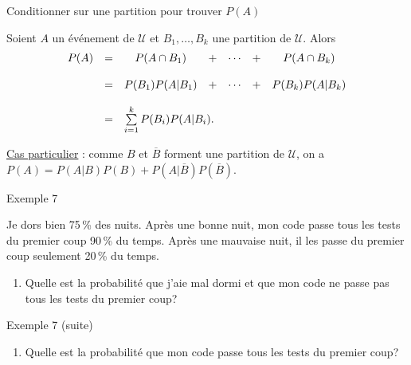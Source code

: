 \documentclass{BeamerTemplate}
\newcommand{\cibleReponse}{}
\newcommand{\lienreponse}[1]{\gdef\cibleReponse{#1}}
\begin{document}
\begin{frame}[t]{Conditionner sur une partition pour trouver $P(A)$}
 \begin{thm}{}
  Soient $A$ un événement de $\mathcal{U}$ et $B_1,\ldots,B_k$ une partition
  de $\mathcal{U}$. Alors
  $$\begin{array}{llccccc}
P(A)&=& P(A\cap B_1) &+&\cdots&+&P(A\cap B_k)\\
&&&&&&\\
    &=&P(B_1)P(A|B_1)&+&\cdots&+&P(B_k)P(A|B_k)\\
&&&&&&\\
    &=&\multicolumn{5}{l}{\sum\limits_{i=1}^k P(B_i)P(A|B_i).}\\
\end{array}
$$
 \end{thm}


 \bigskip
 \underline{Cas particulier} : comme $B$ et $\overline{B}$ forment une partition
 de $\mathcal{U}$, on a $P(A)=P(A|B)P(B)+P(A|\overline{B})P(\overline{B})$.
\end{frame}
\begin{frame}[t,label=ex7]{Exemple 7}

{\small Je dors bien 75\,\% des nuits. Après une bonne nuit, mon code passe tous les
 tests du premier coup 90\,\% du temps. Après une mauvaise nuit, il les passe du
 premier coup seulement 20\,\% du temps.

\begin{enumerate}\itemsep 2cm
\item[a)] Quelle est la probabilité que j'aie mal dormi et que mon code ne passe pas
 tous les tests du premier coup?
\end{enumerate}

}
\lienreponse{rep-ex2}
\end{frame}
\begin{frame}[t]{Exemple 7 (suite)}

{\small
\begin{enumerate}\itemsep 2cm
\item[b)] Quelle est la probabilité que mon code passe tous les tests du premier coup?
\end{enumerate}


 \vspace{5 cm}

}
\lienreponse{rep-ex2}
\end{frame}
\end{document}
